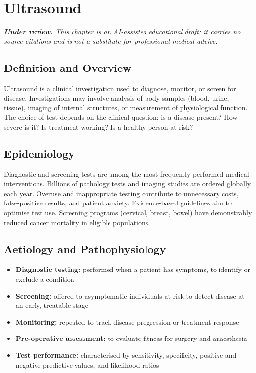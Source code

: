 \chapter{Ultrasound}

\medskip
\noindent\textit{\textbf{Under review.} This chapter is an AI-assisted educational draft; it carries no source citations and is not a substitute for professional medical advice.}

\section*{Definition and Overview}
Ultrasound is a clinical investigation used to diagnose, monitor, or screen for disease. Investigations may involve analysis of body samples (blood, urine, tissue), imaging of internal structures, or measurement of physiological function. The choice of test depends on the clinical question: is a disease present? How severe is it? Is treatment working? Is a healthy person at risk?

\section*{Epidemiology}
Diagnostic and screening tests are among the most frequently performed medical interventions. Billions of pathology tests and imaging studies are ordered globally each year. Overuse and inappropriate testing contribute to unnecessary costs, false-positive results, and patient anxiety. Evidence-based guidelines aim to optimise test use. Screening programs (cervical, breast, bowel) have demonstrably reduced cancer mortality in eligible populations.

\section*{Aetiology and Pathophysiology}
\begin{itemize}
    \item \textbf{Diagnostic testing:} performed when a patient has symptoms, to identify or exclude a condition
    \item \textbf{Screening:} offered to asymptomatic individuals at risk to detect disease at an early, treatable stage
    \item \textbf{Monitoring:} repeated to track disease progression or treatment response
    \item \textbf{Pre-operative assessment:} to evaluate fitness for surgery and anaesthesia
    \item \textbf{Test performance:} characterised by sensitivity, specificity, positive and negative predictive values, and likelihood ratios
\end{itemize}


